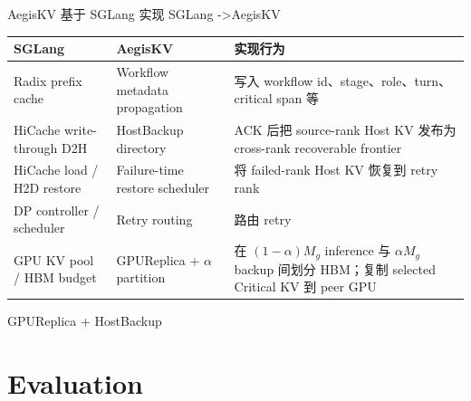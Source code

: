 \documentclass[aspectratio=43]{beamer}
\begin{document}
\begin{frame}{AegisKV 基于 SGLang 实现}
  \scriptsize
  SGLang ->AegisKV 
  \vspace{0.4cm}

  \vspace{0.06cm}
  \renewcommand{\arraystretch}{1.08}
  \begin{tabular}{
    >{\raggedright\arraybackslash}p{}
    >{\raggedright\arraybackslash}p{}
    >{\raggedright\arraybackslash}p{}
  }
    \toprule
    SGLang & AegisKV & 实现行为 \\
    \midrule
    Radix prefix cache & Workflow metadata propagation & 写入 workflow id、stage、role、turn、critical span 等 \\
    HiCache write-through D2H & HostBackup directory & ACK 后把 source-rank Host KV 发布为 cross-rank recoverable frontier \\
    HiCache load / H2D restore & Failure-time restore scheduler & 将 failed-rank Host KV 恢复到 retry rank \\
    DP controller / scheduler & Retry routing & 路由 retry \\
    GPU KV pool / HBM budget & GPUReplica + $\alpha$ partition & 在 $(1-\alpha)M_g$ inference 与 $\alpha M_g$ backup 间划分 HBM；复制 selected Critical KV 到 peer GPU \\
    \bottomrule
  \end{tabular}

  \vspace{0.4cm}
  \footnotesize
  GPUReplica + HostBackup
\end{frame}

\section{Evaluation}
\end{document}
